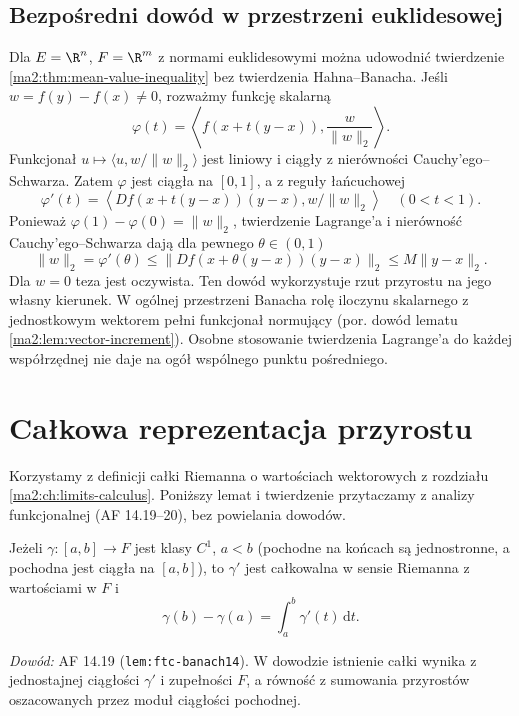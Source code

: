 \subsection{Bezpośredni dowód w przestrzeni euklidesowej}

Dla $E=\R^n$, $F=\R^m$ z normami euklidesowymi
można udowodnić twierdzenie
\ref{ma2:thm:mean-value-inequality} bez twierdzenia
Hahna--Banacha. Jeśli $w=f(y)-f(x)\ne0$, rozważmy
funkcję skalarną
\[
 \varphi(t)=\left\langle f(x+t(y-x)),\frac{w}{\|w\|_2}
                         \right\rangle.
\]
Funkcjonał $u\mapsto\langle u,w/\|w\|_2\rangle$
jest liniowy i ciągły z nierówności
Cauchy'ego--Schwarza. Zatem $\varphi$ jest ciągła
na $[0,1]$, a z reguły łańcuchowej
\[
 \varphi'(t)=
 \left\langle Df(x+t(y-x))(y-x),w/\|w\|_2\right\rangle
 \quad(0<t<1).
\]
Ponieważ
$\varphi(1)-\varphi(0)=\|w\|_2$, twierdzenie Lagrange'a
i nierówność Cauchy'ego--Schwarza dają dla pewnego
$\theta\in(0,1)$
\[
 \|w\|_2=\varphi'(\theta)
 \le \|Df(x+\theta(y-x))(y-x)\|_2
 \le M\|y-x\|_2 .
\]
Dla $w=0$ teza jest oczywista. Ten dowód wykorzystuje
rzut przyrostu na jego własny kierunek. W ogólnej
przestrzeni Banacha rolę iloczynu skalarnego z
jednostkowym wektorem pełni funkcjonał normujący
(por. dowód lematu \ref{ma2:lem:vector-increment}).
Osobne stosowanie twierdzenia Lagrange'a do każdej
współrzędnej nie daje na ogół wspólnego punktu
pośredniego.

\section{Całkowa reprezentacja przyrostu}

Korzystamy z definicji całki Riemanna o wartościach
wektorowych z rozdziału \ref{ma2:ch:limits-calculus}.
Poniższy lemat i twierdzenie przytaczamy z analizy
funkcjonalnej (AF 14.19--20), bez powielania dowodów.

\begin{lemat}
\label{ma2:lem:ftc-banach}
Jeżeli $\gamma:[a,b]\to F$ jest klasy $C^1$,
$a<b$ (pochodne na końcach są jednostronne, a
pochodna jest ciągła na $[a,b]$), to $\gamma'$ jest
całkowalna w sensie Riemanna z wartościami w $F$ i
\[
 \gamma(b)-\gamma(a)=\int_a^b\gamma'(t)\,\mathrm dt.
\]
\end{lemat}
\emph{Dowód:} AF 14.19 (\texttt{lem:ftc-banach14}).
W dowodzie istnienie całki wynika z jednostajnej
ciągłości $\gamma'$ i zupełności $F$, a równość z
sumowania przyrostów oszacowanych przez moduł
ciągłości pochodnej.

